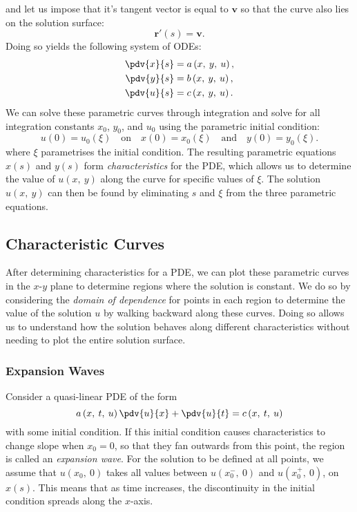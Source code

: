 \documentclass{article}
\theoremstyle{definition}
\begin{document}
and let us impose that it's tangent vector is equal to \(\symbf{v}\)
so that the curve also lies on the solution surface:
\begin{equation*}
    \symbf{r}'\left( s \right) = \symbf{v}.
\end{equation*}
Doing so yields the following system of ODEs:
\begin{align*}
    \displaystyle\pdv{x}{s} & = a\left( x,\: y,\: u \right), \\
    \displaystyle\pdv{y}{s} & = b\left( x,\: y,\: u \right), \\
    \displaystyle\pdv{u}{s} & = c\left( x,\: y,\: u \right).
\end{align*}
We can solve these parametric curves through integration and solve for
all integration constants \(x_0\), \(y_0\), and \(u_0\) using the
parametric initial condition:
\begin{equation*}
    u\left( 0 \right) = u_0\left( \xi \right) \quad \text{on} \quad x\left( 0 \right) = x_0\left( \xi \right) \quad \text{and} \quad y\left( 0 \right) = y_0\left(\xi \right).
\end{equation*}
where \(\xi\) parametrises the initial condition. The resulting parametric
equations \(x\left( s \right)\) and \(y\left( s \right)\) form
\textit{characteristics} for the PDE, which allows us to determine the
value of \(u\left( x,\: y \right)\) along the curve for specific values
of \(\xi\). The solution \(u\left( x,\: y \right)\) can then be found by
eliminating \(s\) and \(\xi\) from the three parametric equations.
\subsection{Characteristic Curves}
After determining characteristics for a PDE, we can plot these
parametric curves in the \(x\)-\(y\) plane to determine regions where
the solution is constant. We do so by considering the \textit{domain of
dependence} for points in each region to determine the value of the
solution \(u\) by walking backward along these curves. Doing so allows
us to understand how the solution behaves along different
characteristics without needing to plot the entire solution surface.
\subsubsection{Expansion Waves}
Consider a quasi-linear PDE of the form
\begin{equation*}
    a\left( x,\: t,\: u \right) \pdv{u}{x} + \pdv{u}{t} = c\left( x,\: t,\: u \right)
\end{equation*}
with some initial condition. If this initial condition causes
characteristics to change slope when \(x_0 = 0\), so that they fan
outwards from this point, the region is called an \textit{expansion wave}.
For the solution to be defined at all points, we assume that
\(u\left( x_0,\: 0 \right)\) takes all values between \(u\left( x_0^-,\: 0 \right)\) and \(u\left( x_0^+,\: 0 \right)\),
on \(x\left( s \right)\). This means that as time increases, the
discontinuity in the initial condition spreads along the \(x\)-axis.
\end{document}

